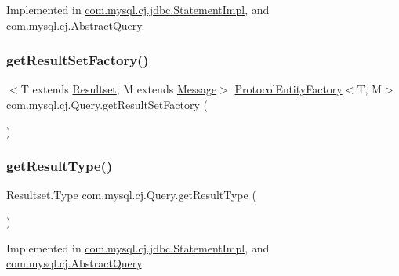 Implemented in \mbox{\hyperlink{classcom_1_1mysql_1_1cj_1_1jdbc_1_1_statement_impl_a1c6f564765bab67e9f9330b362f930ca}{com.\+mysql.\+cj.\+jdbc.\+Statement\+Impl}}, and \mbox{\hyperlink{classcom_1_1mysql_1_1cj_1_1_abstract_query_adad8ca4659c2d530cb42eac038cc0468}{com.\+mysql.\+cj.\+Abstract\+Query}}.

\mbox{\label{interfacecom_1_1mysql_1_1cj_1_1_query_a65a08bc19f00ca6ae30fa9d7666e9f51}} 
\subsubsection{\texorpdfstring{get\+Result\+Set\+Factory()}{getResultSetFactory()}}
{\footnotesize\ttfamily $<$T extends \mbox{\hyperlink{interfacecom_1_1mysql_1_1cj_1_1protocol_1_1_resultset}{Resultset}}, M extends \mbox{\hyperlink{interfacecom_1_1mysql_1_1cj_1_1protocol_1_1_message}{Message}}$>$ \mbox{\hyperlink{interfacecom_1_1mysql_1_1cj_1_1protocol_1_1_protocol_entity_factory}{Protocol\+Entity\+Factory}}$<$T, M$>$ com.\+mysql.\+cj.\+Query.\+get\+Result\+Set\+Factory (\begin{DoxyParamCaption}{ }\end{DoxyParamCaption})}

\mbox{\label{interfacecom_1_1mysql_1_1cj_1_1_query_a1e97cf75ff946bef7b89512a69199b90}} 
\subsubsection{\texorpdfstring{get\+Result\+Type()}{getResultType()}}
{\footnotesize\ttfamily Resultset.\+Type com.\+mysql.\+cj.\+Query.\+get\+Result\+Type (\begin{DoxyParamCaption}{ }\end{DoxyParamCaption})}



Implemented in \mbox{\hyperlink{classcom_1_1mysql_1_1cj_1_1jdbc_1_1_statement_impl_a4f0bfa0851a118ae62acd9420304bdd0}{com.\+mysql.\+cj.\+jdbc.\+Statement\+Impl}}, and \mbox{\hyperlink{classcom_1_1mysql_1_1cj_1_1_abstract_query_a0102246c803083e6368ceb9052275694}{com.\+mysql.\+cj.\+Abstract\+Query}}.


